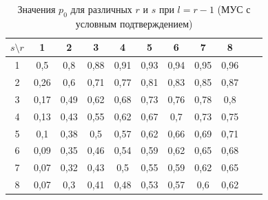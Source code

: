 \begin{table}[!h]
\centering
\begin{tabular}{|c|c|c|c|c|c|c|c|c|c|c|}
\hline
$s \setminus  r$	&1&	2&	3&	4&	5&	6&	7&	8 \\ %
\hline
1	&0,5	&0,8	&0,88	&0,91	&0,93	&0,94	&0,95	&0,96 \\ %
2	&0,26	&0,6	&0,71	&0,77	&0,81	&0,83	&0,85	&0,87 \\ %
3	&0,17	&0,49	&0,62	&0,68	&0,73	&0,76	&0,78	&0,8 \\ %
4	&0,13	&0,43	&0,55	&0,62	&0,67	&0,7	&0,73	&0,75 \\ %
5	&0,1	&0,38	&0,5	&0,57	&0,62	&0,66	&0,69	&0,71 \\ %
6	&0,09	&0,35	&0,46	&0,54	&0,59	&0,62	&0,65	&0,68 \\ %
7	&0,07	&0,32	&0,43	&0,5	&0,55	&0,59	&0,62	&0,65 \\ %
8	&0,07	&0,3	&0,41	&0,48	&0,53	&0,57	&0,6	&0,62 \\ %

\hline
\end{tabular}
 \caption{\label{table:RSpConfirm} Значения $p_0$ для различных $r$ и $s$ при $l=r-1$ (МУС с условным подтверждением)}
\end{table}


